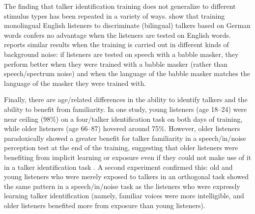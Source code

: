 The finding that talker identification training does not generalize to different stimulus types has been repeated in a variety of ways.  \citet{LeviEtAl2011} show that training monolingual English listeners to discriminate (bilingual) talkers based on German words confers no advantage when the listeners are tested on English words.\footnotemark{}  \citet{VanEngen2012} reports similar results when the training is carried out in different kinds of background noise: if listeners are tested on speech with a babble masker, they perform better when they were trained with a babble masker (rather than speech\-/spectrum noise) and when the language of the babble masker matches the language of the masker they were trained with.



Finally, there are age\-/related differences in the ability to identify talkers and the ability to benefit from familiarity.  In one study, young listeners (age 18–24) were near ceiling (98\%) on a four\-/talker identification task on both days of training, while older listeners (age 66–87) hovered around 75\%.  However, older listeners paradoxically showed a greater benefit for talker familiarity in a speech\-/in\-/noise perception test at the end of the training, suggesting that older listeners were benefiting from implicit learning or exposure even if they could not make use of it in a talker identification task \citep{YonanSommers2000}.  A second experiment confirmed this: old and young listeners who were merely exposed to talkers in an orthogonal task showed the same pattern in a speech\-/in\-/noise task as the listeners who were expressly learning talker identification (namely, familiar voices were more intelligible, and older listeners benefited more from exposure than young listeners).

